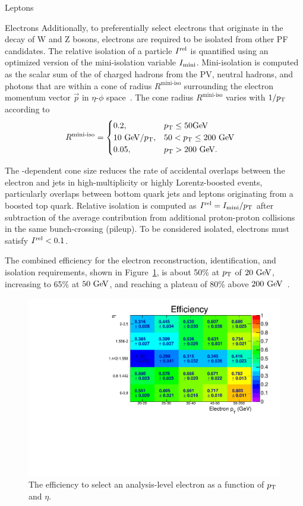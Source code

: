 \begin{section}{Leptons}
\begin{subsection}{Electrons}
Additionally, to preferentially select electrons that originate in the decay of W and Z bosons, electrons are required to be isolated from other PF candidates.
The relative isolation of a particle $I^{\mathrm{rel}}$ is quantified using an optimized version of the mini-isolation variable $I_{\mathrm{mini}}$.
Mini-isolation is computed as the scalar sum of the \pT of charged hadrons from the PV, neutral hadrons, and photons that are within a cone of radius $R^{\text{mini-iso}}$ surrounding the electron momentum vector $\vec{p}$ in $\eta$-$\phi$ space~\cite{Rehermann:2010vq}.
The cone radius $R^{\text{mini-iso}}$ varies with $1/p_{\mathrm{T}}$ according to
\begin{align}
R^{\text{mini-iso}} &=\begin{cases} 0.2, &
p_{\mathrm{T}} \leq 50\mathrm{Ge\kern -0.1em V} \\
{10~\mathrm{Ge\kern -0.1em V}}/{p_{\mathrm{T}}}, & 50 < p_{\mathrm{T}} \leq 200~\mathrm{Ge\kern -0.1em V} \\
0.05, & p_{\mathrm{T}} > 200~\mathrm{Ge\kern -0.1em V}.
\end{cases}
\end{align}

The \pT-dependent cone size reduces the rate of accidental overlaps between the electron and jets in high-multiplicity or highly Lorentz-boosted events, particularly overlaps between bottom quark jets and leptons originating from a boosted top quark.
Relative isolation is computed as $I^{\mathrm{rel}} = I_{\mathrm{mini}}/p_{\mathrm{T}}$ after subtraction of the average contribution from additional proton-proton collisions in the same bunch-crossing (pileup).
To be considered isolated, electrons must satisfy $I^{\mathrm{rel}} < 0.1$.

The combined efficiency for the electron reconstruction, identification, and isolation requirements, shown in Figure~\ref{fig:electron_eff}, is about 50\% at $p_{\mathrm{T}}$ of $20~\mathrm{Ge\kern -0.1em V}$, increasing to 65\% at $50~\mathrm{Ge\kern -0.1em V}$, and reaching a plateau of 80\% above $200~\mathrm{Ge\kern -0.1em V}$~\cite{Khachatryan:2015hwa}.

\begin{figure}[tbp!]
\centering
\includegraphics[angle=0,width=0.80\columnwidth]{fig/electron_eff.pdf}
\caption{The efficiency to select an analysis-level electron as a function of $p_{\mathrm{T}}$ and $\eta$.}
\label{fig:electron_eff}
\end{figure}


\end{subsection}
\end{section}
